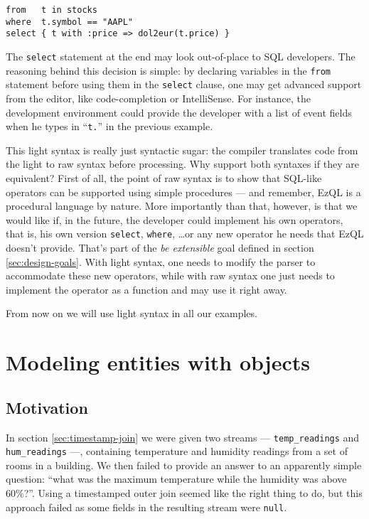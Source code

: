 \documentclass{report}
\begin{document}
\begin{verbatim}
from   t in stocks
where  t.symbol == "AAPL"
select { t with :price => dol2eur(t.price) }
\end{verbatim}

The \verb=select= statement at the end may look out-of-place to SQL
developers. The reasoning behind this decision is simple: by declaring
variables in the \verb=from= statement before using them in the
\verb=select= clause, one may get advanced support from the editor,
like code-completion or IntelliSense. For instance, the development
environment could provide the developer with a list of event fields
when he types in ``\verb=t.='' in the previous example.

This light syntax is really just syntactic sugar: the compiler
translates code from the light to raw syntax before processing. Why
support both syntaxes if they are equivalent? First of all, the point
of raw syntax is to show that SQL-like operators can be supported
using simple procedures --- and remember, EzQL is a procedural
language by nature. More importantly than that, however, is that we
would like if, in the future, the developer could implement his own
operators, that is, his own version \verb=select=, \verb=where=,
\ldots or any new operator he needs that EzQL doesn't provide. That's
part of the \emph{be extensible} goal defined in section
\ref{sec:design-goals}. With light syntax, one needs to modify the
parser to accommodate these new operators, while with raw syntax one
just needs to implement the operator as a function and may use it
right away.

From now on we will use light syntax in all our examples.

\chapter{Modeling entities with objects}
\label{chap:objects}

\section{Motivation}

In section \ref{sec:timestamp-join} we were given two streams ---
\verb=temp_readings= and \verb=hum_readings= ---, containing
temperature and humidity readings from a set of rooms in a
building. We then failed to provide an answer to an apparently simple
question: ``what was the maximum temperature while the humidity was
above 60\%?''. Using a timestamped outer join seemed like the right
thing to do, but this approach failed as some fields in the resulting
stream were \verb=null=.
\end{document}
